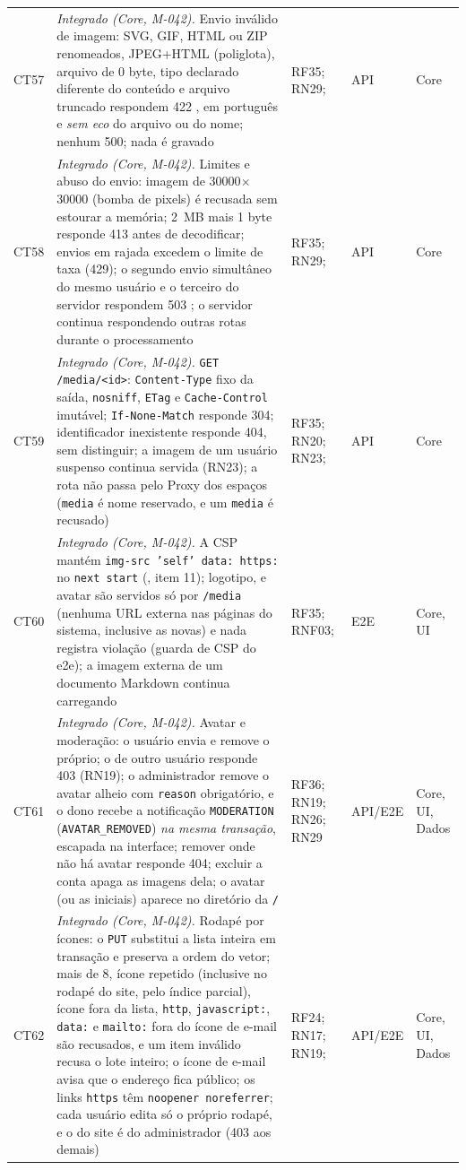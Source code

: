 \begin{longtable}{@{}L{1.1cm}L{7.0cm}L{2.2cm}L{1.6cm}L{1.6cm}@{}}
CT57 & \emph{Integrado (Core, M-042).} Envio inválido de imagem: SVG, GIF, HTML ou ZIP renomeados, JPEG+HTML (poliglota), arquivo de 0 byte, tipo declarado diferente do conteúdo e arquivo truncado respondem 422 , em português e \emph{sem eco} do arquivo ou do nome; nenhum 500; nada é gravado & RF35; RN29;  & API & Core\\[2pt]
CT58 & \emph{Integrado (Core, M-042).} Limites e abuso do envio: imagem de 30000$\times$30000 (bomba de pixels) é recusada sem estourar a memória; 2~MB mais 1 byte responde 413 antes de decodificar; envios em rajada excedem o limite de taxa (429); o segundo envio simultâneo do mesmo usuário e o terceiro do servidor respondem 503 ; o servidor continua respondendo outras rotas durante o processamento & RF35; RN29;  & API & Core\\[2pt]
CT59 & \emph{Integrado (Core, M-042).} \texttt{GET /media/<id>}: \texttt{Content-Type} fixo da saída, \texttt{nosniff}, \texttt{ETag} e \texttt{Cache-Control} imutável; \texttt{If-None-Match} responde 304; identificador inexistente responde 404, sem distinguir; a imagem de um usuário suspenso continua servida (RN23); a rota não passa pelo Proxy dos espaços (\texttt{media} é nome reservado, e um  \texttt{media} é recusado) & RF35; RN20; RN23;  & API & Core\\[2pt]
CT60 & \emph{Integrado (Core, M-042).} A CSP mantém \texttt{img-src 'self' data: https:} no \texttt{next start} (, item 11); logotipo,  e avatar são servidos só por \texttt{/media} (nenhuma URL externa nas páginas do sistema, inclusive as novas) e nada registra violação (guarda de CSP do e2e); a imagem externa de um documento Markdown continua carregando & RF35; RNF03;  & E2E & Core, UI\\[2pt]
CT61 & \emph{Integrado (Core, M-042).} Avatar e moderação: o usuário envia e remove o próprio; o de outro usuário responde 403 (RN19); o administrador remove o avatar alheio com \texttt{reason} obrigatório, e o dono recebe a notificação \texttt{MODERATION} (\texttt{AVATAR\_REMOVED}) \emph{na mesma transação}, escapada na interface; remover onde não há avatar responde 404; excluir a conta apaga as imagens dela; o avatar (ou as iniciais) aparece no diretório da \texttt{/} & RF36; RN19; RN26; RN29 & API/E2E & Core, UI, Dados\\[2pt]
CT62 & \emph{Integrado (Core, M-042).} Rodapé por ícones: o \texttt{PUT} substitui a lista inteira em transação e preserva a ordem do vetor; mais de 8, ícone repetido (inclusive no rodapé do site, pelo índice parcial), ícone fora da lista, \texttt{http}, \texttt{javascript:}, \texttt{data:} e \texttt{mailto:} fora do ícone de e-mail são recusados, e um item inválido recusa o lote inteiro; o ícone de e-mail avisa que o endereço fica público; os links \texttt{https} têm \texttt{noopener noreferrer}; cada usuário edita só o próprio rodapé, e o do site é do administrador (403 aos demais) & RF24; RN17; RN19;  & API/E2E & Core, UI, Dados\\[2pt]

\end{longtable}
